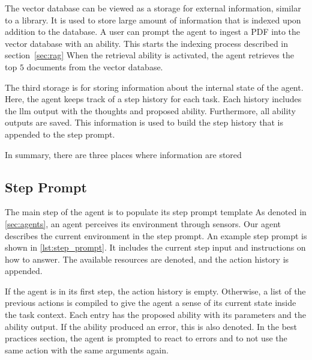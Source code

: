 \documentclass[../main.tex]{subfiles}
\begin{document}
The vector database can be viewed as a storage for external information,
similar to a library.
It is used to store large amount of information that is indexed upon addition
to the database.
A user can prompt the agent to ingest a PDF into the vector database with an ability.
This starts the indexing process described in section~\ref{sec:rag}
When the retrieval ability is activated, the agent retrieves the top $5$ documents
from the vector database.

The third storage is for storing information about the internal state of the agent.
Here, the agent keeps track of a step history for each task.
Each history includes the \gls{llm} output with the thoughts and proposed ability.
Furthermore, all ability outputs are saved.
This information is used to build the step history that is appended to the step prompt.

In summary, there are three places where information are stored

\subsection{Step Prompt}



The main step of the agent is to populate its step prompt template
As denoted in \autoref{sec:agents}, an agent perceives its environment through sensors.
Our agent describes the current environment in the step prompt.
An example step prompt is shown in \autoref{lst:step_prompt}.
It includes the current step input and instructions on how to answer.
The available resources are denoted, and the action history is appended.

If the agent is in its first step, the action history is empty.
Otherwise, a list of the previous actions is compiled to give the agent a sense of its current state inside the task context.
Each entry has the proposed ability with its parameters and the ability output.
If the ability produced an error, this is also denoted.
In the best practices section, the agent is prompted to react to errors and to not use the same action with the same arguments again.
\end{document}
